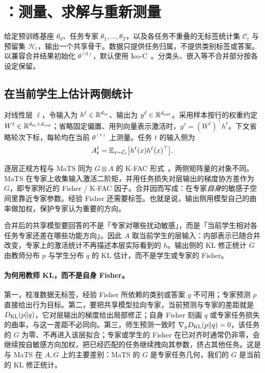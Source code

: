 \section{\method{}：测量、求解与重新测量}
\label{sec:method}

给定预训练基座 $\theta_0$、任务专家 $\theta_1,\ldots,\theta_T$，以及各任务不重叠的无标签统计集 $\mathcal C_t$ 与预留集 $\mathcal H_t$，输出一个共享骨干。数据只提供任务归属，不提供类别标签或答案。以兼容合并结果初始化 $\theta^{(0)}$，默认使用 Iso-C~\citep{marczak2025no}。分类头、嵌入等不合并部分按各设定保留。

\subsection{在当前学生上估计两侧统计}
对线性层 $\ell$，令输入为 $h^\ell\in\mathbb R^{d_{\rm in}}$、输出为 $y^\ell\in\mathbb R^{d_{\rm out}}$。采用样本按行的权重约定 $W^\ell\in\mathbb R^{d_{\rm in}\times d_{\rm out}}$；省略固定偏置、用列向量表示激活时，$y^\ell=(W^\ell)^\top h^\ell$。下文省略轮次下标，每轮均在当前 $\theta^{(r)}$ 上测量。任务 $t$ 的输入侧为
\begin{equation}
 A_t^\ell=\mathbb E_{x\sim\mathcal C_t}\big[h^\ell(x)h^\ell(x)^\top\big].
 \label{eq:input}
\end{equation}

逐层正规方程与 MaTS 同为 $G\otimes A$ 的 K-FAC 形式~\citep{tam2024mats,martens2015kfac}。两侧矩阵量的对象不同。MaTS 在专家上收集输入激活二阶矩，并用任务损失对层输出的梯度协方差作为 $G$，即专家附近的 Fisher / K-FAC 因子。合并因而写成：在专家\emph{自身}的敏感子空间里靠近专家参数。经验 Fisher 还需要标签。也就是说，输出侧用模型自己的曲率做加权，保护专家认为重要的方向。

合并后的共享模型要回答的不是「专家对哪些扰动敏感」，而是「当前学生相对各任务专家还差在哪些功能方向」。因此 $A$ 取当前学生的层输入：内部表示已随合并改变，专家上的激活统计不再描述本层实际看到的 $h$。输出侧的 KL 修正统计 $G$ 由教师分布 $p$ 与学生分布 $q$ 的 KL 估计，而不是学生或专家的 Fisher。

\paragraph{为何用教师 KL，而不是自身 Fisher。}
第一，校准数据无标签，经验 Fisher 所依赖的类别或答案 $y$ 不可用；专家预测 $p$ 直接给出行为目标。第二，要把共享模型拉向专家，当前预测与专家的差距就是 $D_{\mathrm{KL}}(p\Vert q)$，它对层输出的梯度给出局部修正；自身 Fisher 刻画 $q$ 或专家任务损失的曲率，与这一差距不必同向。第三，师生预测一致时 $\nabla_{y}D_{\mathrm{KL}}(p\Vert q)=0$，该任务的 $G$ 为零、不再进入该层拟合；专家或学生的 Fisher 在已对齐时通常仍非零，会继续按自敏感方向加权，把已经匹配的任务继续拽向其参数，挤占其他任务。这是与 MaTS 在 $A,G$ 上的主要差别：MaTS 的 $G$ 是专家任务几何，我们的 $G$ 是当前的 KL 修正统计。

